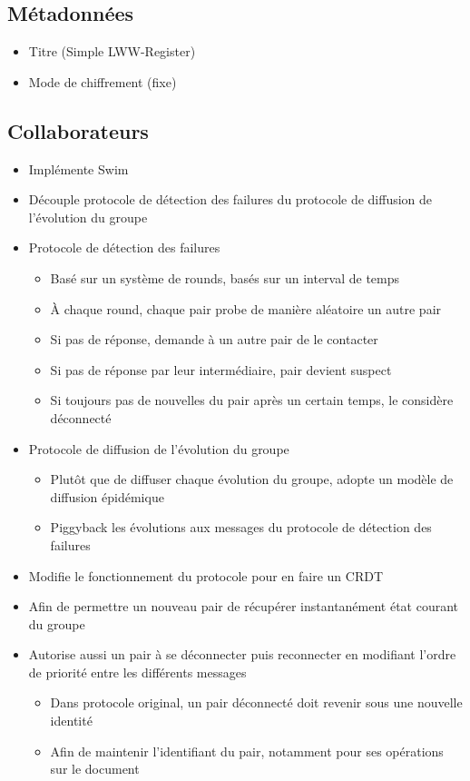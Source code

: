 \documentclass[12pt]{thesul}
\begin{document}
\subsection{Métadonnées}

\begin{itemize}
  \item Titre (Simple LWW-Register)
  \item Mode de chiffrement (fixe)
\end{itemize}

\subsection{Collaborateurs}

\begin{itemize}
  \item Implémente Swim \cite{swim2002}
  \item Découple protocole de détection des failures du protocole de diffusion de l'évolution du groupe
  \item Protocole de détection des failures
    \begin{itemize}
      \item Basé sur un système de rounds, basés sur un interval de temps
      \item À chaque round, chaque pair probe de manière aléatoire un autre pair
      \item Si pas de réponse, demande à un autre pair de le contacter
      \item Si pas de réponse par leur intermédiaire, pair devient suspect
      \item Si toujours pas de nouvelles du pair après un certain temps, le considère déconnecté
    \end{itemize}
  \item Protocole de diffusion de l'évolution du groupe
    \begin{itemize}
      \item Plutôt que de diffuser chaque évolution du groupe, adopte un modèle de diffusion épidémique
      \item Piggyback les évolutions aux messages du protocole de détection des failures
    \end{itemize}
  \item Modifie le fonctionnement du protocole pour en faire un CRDT
  \item Afin de permettre un nouveau pair de récupérer instantanément état courant du groupe
  \item Autorise aussi un pair à se déconnecter puis reconnecter en modifiant l'ordre de priorité entre les différents messages
  \begin{itemize}
    \item Dans protocole original, un pair déconnecté doit revenir sous une nouvelle identité
    \item Afin de maintenir l'identifiant du pair, notamment pour ses opérations sur le document
  \end{itemize}
\end{itemize}
\end{document}
